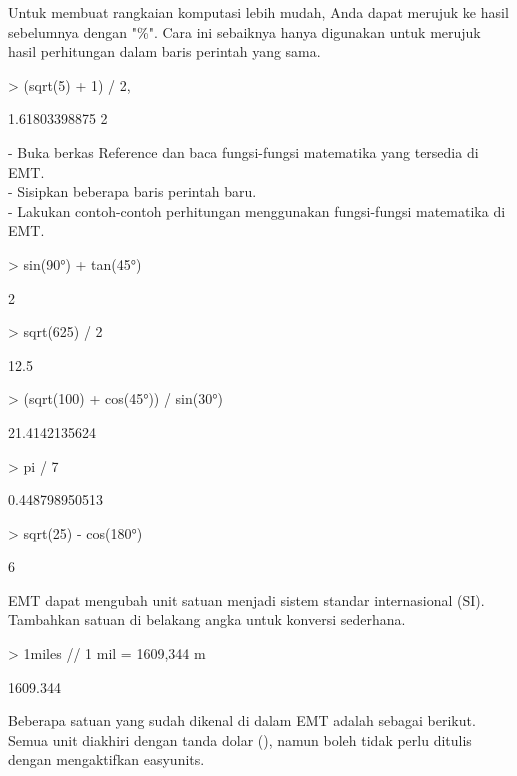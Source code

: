 \documentclass[a4paper,10pt]{article}
\begin{document}
\begin{eulernotebook}
\begin{eulercomment}
\begin{eulercomment}
\begin{eulercomment}
Untuk membuat rangkaian komputasi lebih mudah, Anda dapat merujuk ke
hasil sebelumnya dengan "\%". Cara ini sebaiknya hanya digunakan untuk
merujuk hasil perhitungan dalam baris perintah yang sama.
\end{eulercomment}
\begin{eulerprompt}
> (sqrt(5) + 1) / 2, %
\end{eulerprompt}
\begin{euleroutput}
  1.61803398875
  2
\end{euleroutput}
\begin{eulercomment}
- Buka berkas Reference dan baca fungsi-fungsi matematika yang
tersedia di EMT.\\
- Sisipkan beberapa baris perintah baru.\\
- Lakukan contoh-contoh perhitungan menggunakan fungsi-fungsi
matematika di EMT.
\end{eulercomment}
\begin{eulerprompt}
> sin(90°) + tan(45°)
\end{eulerprompt}
\begin{euleroutput}
  2
\end{euleroutput}
\begin{eulerprompt}
> sqrt(625) / 2
\end{eulerprompt}
\begin{euleroutput}
  12.5
\end{euleroutput}
\begin{eulerprompt}
> (sqrt(100) + cos(45°)) / sin(30°)
\end{eulerprompt}
\begin{euleroutput}
  21.4142135624
\end{euleroutput}
\begin{eulerprompt}
> pi / 7
\end{eulerprompt}
\begin{euleroutput}
  0.448798950513
\end{euleroutput}
\begin{eulerprompt}
> sqrt(25) - cos(180°)
\end{eulerprompt}
\begin{euleroutput}
  6
\end{euleroutput}
\begin{eulercomment}
EMT dapat mengubah unit satuan menjadi sistem standar internasional
(SI). Tambahkan satuan di belakang angka untuk konversi sederhana.
\end{eulercomment}
\begin{eulerprompt}
> 1miles // 1 mil = 1609,344 m
\end{eulerprompt}
\begin{euleroutput}
  1609.344
\end{euleroutput}
\begin{eulercomment}
Beberapa satuan yang sudah dikenal di dalam EMT adalah sebagai
berikut. Semua unit diakhiri dengan tanda dolar (\textdollar{}), namun boleh tidak
perlu ditulis dengan mengaktifkan easyunits.


\end{eulercomment}
\end{eulercomment}
\end{eulercomment}
\end{eulernotebook}
\end{document}
